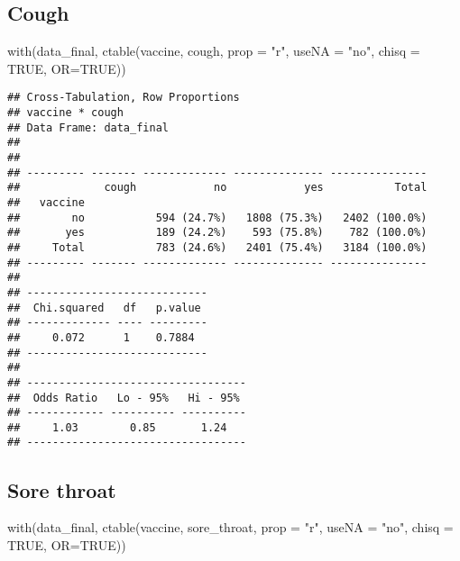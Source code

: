 \documentclass[
]{article}
\newenvironment{Shaded}{\begin{snugshade}}{\end{snugshade}}
\newcommand{\AttributeTok}[1]{\textcolor[rgb]{0.77,0.63,0.00}{#1}}
\newcommand{\ConstantTok}[1]{\textcolor[rgb]{0.00,0.00,0.00}{#1}}
\newcommand{\FunctionTok}[1]{\textcolor[rgb]{0.00,0.00,0.00}{#1}}
\newcommand{\NormalTok}[1]{#1}
\newcommand{\StringTok}[1]{\textcolor[rgb]{0.31,0.60,0.02}{#1}}
\begin{document}
\hypertarget{cough}{%
\subsection{Cough}\label{cough}}

\begin{Shaded}
\begin{Highlighting}[]
\FunctionTok{with}\NormalTok{(data\_final, }\FunctionTok{ctable}\NormalTok{(vaccine, cough, }\AttributeTok{prop =} \StringTok{"r"}\NormalTok{, }\AttributeTok{useNA =} \StringTok{"no"}\NormalTok{, }\AttributeTok{chisq =} \ConstantTok{TRUE}\NormalTok{, }\AttributeTok{OR=}\ConstantTok{TRUE}\NormalTok{))}
\end{Highlighting}
\end{Shaded}

\begin{verbatim}
## Cross-Tabulation, Row Proportions  
## vaccine * cough  
## Data Frame: data_final  
## 
## 
## --------- ------- ------------- -------------- ---------------
##             cough            no            yes           Total
##   vaccine                                                     
##        no           594 (24.7%)   1808 (75.3%)   2402 (100.0%)
##       yes           189 (24.2%)    593 (75.8%)    782 (100.0%)
##     Total           783 (24.6%)   2401 (75.4%)   3184 (100.0%)
## --------- ------- ------------- -------------- ---------------
## 
## ----------------------------
##  Chi.squared   df   p.value 
## ------------- ---- ---------
##     0.072      1    0.7884  
## ----------------------------
## 
## ----------------------------------
##  Odds Ratio   Lo - 95%   Hi - 95% 
## ------------ ---------- ----------
##     1.03        0.85       1.24   
## ----------------------------------
\end{verbatim}

\hypertarget{sore-throat}{%
\subsection{Sore throat}\label{sore-throat}}

\begin{Shaded}
\begin{Highlighting}[]
\FunctionTok{with}\NormalTok{(data\_final, }\FunctionTok{ctable}\NormalTok{(vaccine, sore\_throat, }\AttributeTok{prop =} \StringTok{"r"}\NormalTok{, }\AttributeTok{useNA =} \StringTok{"no"}\NormalTok{, }\AttributeTok{chisq =} \ConstantTok{TRUE}\NormalTok{, }\AttributeTok{OR=}\ConstantTok{TRUE}\NormalTok{))}
\end{Highlighting}
\end{Shaded}
\end{document}
